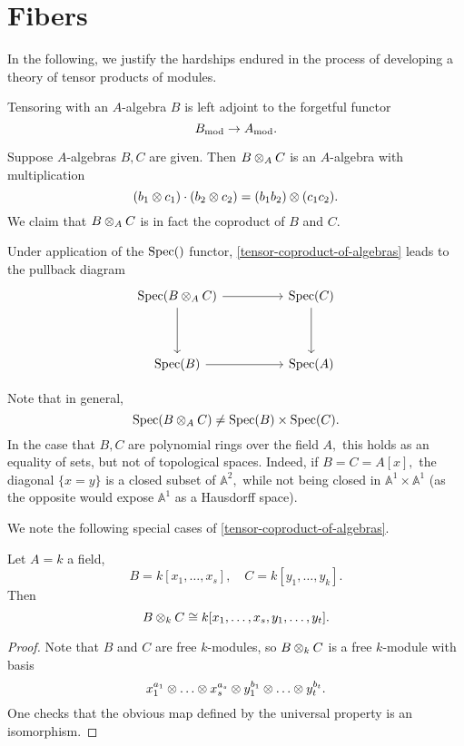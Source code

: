 \section{Fibers}

In the following, we justify the hardships endured in the process of developing a theory of tensor products of modules.

\begin{prop}
Tensoring with an $A$-algebra $B$ is left adjoint to the forgetful functor
\[ {B}_\mathrm{mod} \to {A}_\mathrm{mod}.\]
\end{prop}

\begin{prop}
  \label{tensor-coproduct-of-algebras}
Suppose $A$-algebras $B, C$ are given. Then
\( B \otimes_A C\)
is an $A$-algebra with multiplication
\[ (b_1 \otimes c_1) \cdot (b_2 \otimes c_2) = (b_1 b_2) \otimes (c_1 c_2).\]
We claim that
\( B \otimes_A C\)
is in fact the coproduct of $B$ and $C$.
\end{prop}

\begin{note}
Under application of the \(\text{Spec}()\) functor, \cref{tensor-coproduct-of-algebras} leads to the pullback diagram
\begin{equation*}
  \begin{tikzcd}[column sep = huge, row sep = huge]
    \spec(B \tensor_A C) \arrow{d} \arrow{r}
    & \spec(C) \arrow{d} \\
    \spec(B) \arrow{r}
    & \spec(A)
  \end{tikzcd}
\end{equation*}
\end{note}

Note that in general,
\[ \text{Spec}(B \otimes_A C) \neq \text{Spec}(B) \times \text{Spec}(C).\]
In the case that \(B, C\) are polynomial rings over the field \(A,\) this holds as an equality of sets, but not of topological spaces. Indeed, if \(B = C = A[x],\) the diagonal \(\{x = y\}\) is a closed subset of \(\mathbb{A}^2,\) while not being closed in \(\mathbb{A}^1 \times \mathbb{A}^1\) (as the opposite would expose \(\mathbb{A}^1\) as a Hausdorff space).

We note the following special cases of \cref{tensor-coproduct-of-algebras}.

\begin{corollary}
  Let $A = k$ a field,
  \[ B = k[x_1, \dotsc, x_s], \quad C = k[y_1, \dotsc, y_k].\]
  Then
  \[ B \otimes_k C \cong k[x_1, \dotsc, x_s, y_1, \dotsc, y_t].\]
\end{corollary}
\begin{proof}
  Note that $B$ and $C$ are free $k$-modules, so $B \otimes_k C$ is a free $k$-module with basis
  \[x_1^{a_1} \otimes \dotso \otimes x_s^{a_s} \otimes y_1^{b_1} \otimes \dotso \otimes y_t^{b_t}.\]
  One checks that the obvious map defined by the universal property is an isomorphism.
\end{proof}

